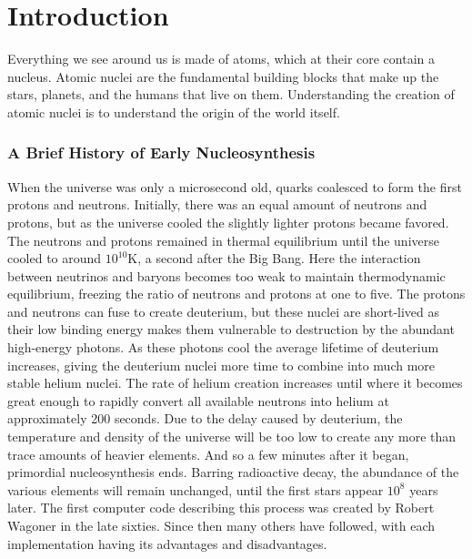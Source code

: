 
\chapter{Introduction}
\label{chap:intro}

Everything we see around us is made of atoms, which at their core contain a nucleus. Atomic nuclei are the fundamental building blocks that make up the stars, planets, and the humans that live on them. Understanding the creation of atomic nuclei is to understand the origin of the world itself. 


\subsection*{A Brief History of Early Nucleosynthesis}
When the universe was only a microsecond old, quarks coalesced to form the first protons and neutrons\cite{NASAUniversehistory}. Initially, there was an equal amount of neutrons and protons, but as the universe cooled the slightly lighter protons became favored. The neutrons and protons remained in thermal equilibrium until the universe cooled to around $10^{10}$K, a second after the Big Bang. Here the interaction between neutrinos and baryons becomes too weak to maintain thermodynamic equilibrium, freezing the ratio of neutrons and protons at one to five. The protons and neutrons can fuse to create deuterium, but these nuclei are short-lived as their low binding energy makes them vulnerable to destruction by the abundant high-energy photons. As these photons cool the average lifetime of deuterium increases,
giving the deuterium nuclei more time to combine into much more stable helium nuclei. The rate of helium creation increases until where it becomes great enough to rapidly convert all available neutrons into helium at approximately 200 seconds. Due to the delay caused by deuterium, the temperature and density of the universe will be too low to create any more than trace amounts of heavier elements. And so a few minutes after it began, primordial nucleosynthesis ends. Barring radioactive decay, the abundance of the various elements will remain unchanged, until the first stars appear $10^8$ years later\cite{klessen2023firststars}. 
The first computer code describing this process was created by Robert Wagoner in the late sixties\cite{Wagoner67}. Since then many others have followed, with each implementation having its advantages and disadvantages.
\clearpage
